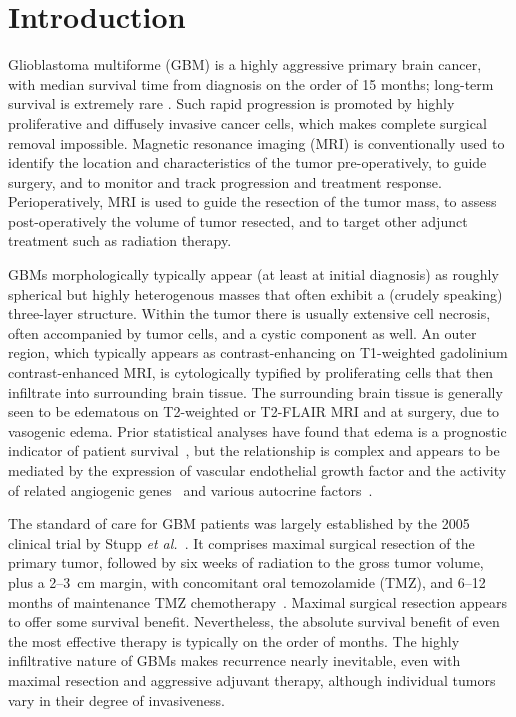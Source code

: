 \documentclass{aims}
\numberwithin{equation}{section}
\begin{document}
\section{Introduction}

Glioblastoma multiforme (GBM) is a highly aggressive primary brain cancer,
with median survival time from diagnosis on the order of 15 months;
long-term survival is extremely rare \cite{Norden2006}.  Such rapid
progression is promoted by highly proliferative and diffusely invasive
cancer cells, which makes complete surgical removal impossible. Magnetic
resonance imaging (MRI) is conventionally used to identify the location and
characteristics of the tumor pre-operatively, to guide surgery, and to
monitor and track progression and treatment response. Perioperatively, MRI
is used to guide the resection of the tumor mass, to assess post-operatively
the volume of tumor resected, and to target other adjunct treatment such as
radiation therapy.

GBMs morphologically typically appear (at least at initial diagnosis) as
roughly spherical but highly heterogenous masses that often exhibit a
(crudely speaking) three-layer structure.  Within the tumor there is usually
extensive cell necrosis, often accompanied by tumor cells, and a cystic
component as well.  An outer region, which typically appears as
contrast-enhancing on T1-weighted gadolinium contrast-enhanced MRI, is
cytologically typified by proliferating cells that then infiltrate into
surrounding brain tissue.  The surrounding brain tissue is generally seen to
be edematous on T2-weighted or T2-FLAIR MRI and at surgery, due to vasogenic
edema.  Prior statistical analyses have found that edema is a prognostic
indicator of patient survival~\cite{Pope2005}, but the relationship is
complex and appears to be mediated by the expression of vascular endothelial
growth factor and the activity of related angiogenic
genes~\cite{Carlson2007} and various autocrine
factors~\cite{Hoelzinger2007}.

The standard of care for GBM patients was largely established by the 2005
clinical trial by Stupp \emph{et al.}~\cite{Stupp2005}.  It comprises
maximal surgical resection of the primary tumor, followed by six weeks of
radiation to the gross tumor volume, plus a 2--3~cm margin, with concomitant
oral temozolamide (TMZ), and 6--12 months of maintenance TMZ chemotherapy~\cite{Gilbert2013}.  Maximal surgical resection
appears to offer some
survival benefit.  Nevertheless, the absolute survival benefit of even the
most effective therapy is typically on the order of months.  The highly
infiltrative nature of GBMs makes recurrence nearly inevitable,
even with maximal resection and aggressive adjuvant therapy,
although individual tumors vary in their degree of invasiveness.
\end{document}
